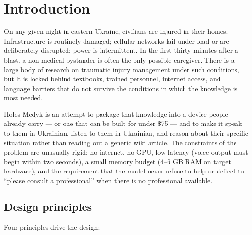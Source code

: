\documentclass{article}
\theoremstyle{plain}
\theoremstyle{definition}
\theoremstyle{remark}
\begin{document}
\section{Introduction}

On any given night in eastern Ukraine, civilians are injured in their homes. Infrastructure is routinely damaged; cellular networks fail under load or are deliberately disrupted; power is intermittent. In the first thirty minutes after a blast, a non-medical bystander is often the only possible caregiver. There is a large body of research on traumatic injury management under such conditions, but it is locked behind textbooks, trained personnel, internet access, and language barriers that do not survive the conditions in which the knowledge is most needed.

Holos Medyk is an attempt to package that knowledge into a device people already carry --- or one that can be built for under \$75 --- and to make it speak to them in Ukrainian, listen to them in Ukrainian, and reason about their specific situation rather than reading out a generic wiki article. The constraints of the problem are unusually rigid: no internet, no GPU, low latency (voice output must begin within two seconds), a small memory budget (4--6 GB RAM on target hardware), and the requirement that the model never refuse to help or deflect to ``please consult a professional'' when there is no professional available.

\subsection{Design principles}

Four principles drive the design:
\end{document}
